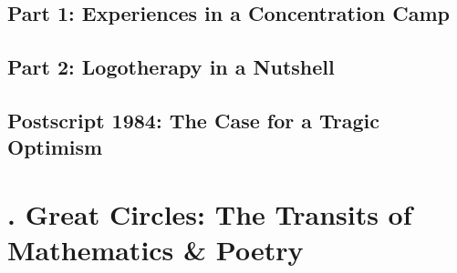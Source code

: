 \documentclass[oneside]{book}
\numberwithin{equation}{section}
\begin{document}

\section{Part 1: Experiences in a Concentration Camp}


\section{Part 2: Logotherapy in a Nutshell}


\section{Postscript 1984: The Case for a Tragic Optimism}


\chapter{\cite{Grosholz2018}. Great Circles: The Transits of Mathematics \& Poetry}
\end{document}
